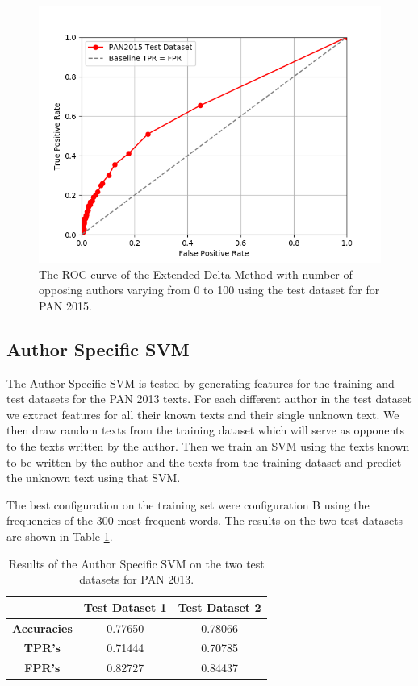 \begin{figure}
    \centering
    \includegraphics[width=.7\textwidth]{./pictures/extended_delta_method_roc.png}
    \caption{The ROC curve of the Extended Delta Method with number of opposing
    authors varying from 0 to 100 using the test dataset for for PAN 2015.}
    \label{fig:extended_delta_method_roc}
\end{figure}

\subsection{Author Specific SVM} \label{subsec:results:author_specific_svm}
The Author Specific SVM is tested by generating features for the training and
test datasets for the PAN 2013 texts. For each different author in the test
dataset we extract features for all their known texts and their single unknown
text. We then draw random texts from the training dataset which will serve as
opponents to the texts written by the author. Then we train an SVM using the
texts known to be written by the author and the texts from the training dataset
and predict the unknown text using that SVM.

The best configuration on the training set were configuration B using the
frequencies of the 300 most frequent words. The results on the two test datasets
are shown in Table \ref{table:svm_results}.

\begin{table}
    \centering
    \begin{tabular}{c|cc}
        & \textbf{Test Dataset 1} & \textbf{Test Dataset 2} \\
        \hline
        \textbf{Accuracies} & 0.77650 & 0.78066 \\
        \textbf{\gls{TPR}'s} & 0.71444 & 0.70785 \\
        \textbf{\gls{FPR}'s} & 0.82727 & 0.84437
    \end{tabular}
    \caption{Results of the Author Specific SVM on the two test datasets for PAN
    2013.}
    \label{table:svm_results}
\end{table}
